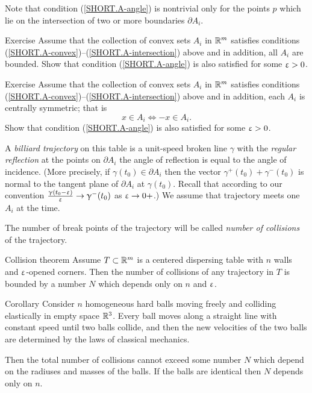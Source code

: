 Note that condition (\ref{SHORT.A-angle}) is nontrivial 
only for the points $p$ which lie 
on the intersection 
of two or more boundaries $\partial A_i$.

\begin{thm}{Exercise}
Assume that the collection of convex sets $A_i$ in $\mathbb{R}^m$ satisfies conditions (\ref{SHORT.A-convex})--(\ref{SHORT.A-intersection}) above and in addition, all $A_i$ are bounded.
Show that condition (\ref{SHORT.A-angle}) is also satisfied for some $\upvarepsilon>0$.
\end{thm}

\begin{thm}{Exercise}
Assume that the collection of convex sets $A_i$ in $\mathbb{R}^m$ satisfies conditions (\ref{SHORT.A-convex})--(\ref{SHORT.A-intersection}) above and in addition, each $A_i$ is centrally symmetric; that is 
\[x\in A_i\iff -x\in A_i.\]
Show that condition (\ref{SHORT.A-angle}) is also satisfied for some $\upvarepsilon>0$.
\end{thm}

A \emph{billiard trajectory} 
on this table is a unit-speed broken line $\gamma$
with the \emph{regular reflection} at the points on $\partial A_i$ the angle of reflection is equal to the angle
of incidence.
(More precisely,  if $\gamma(t_0)\in\partial A_i$ then the vector
$\gamma^+(t_0)+\gamma^-(t_0)$  is normal to the tangent
plane of $\partial A_i$ at $\gamma(t_0)$.
Recall that according to our convention  $\tfrac{\gamma(t_0-\eps)}{\eps}\to\gamma^-(t_0)$ as $\eps\to0+$.)
We assume that trajectory meets one $A_i$ at the time.

The number of break
points of the trajectory will be called \emph{number of collisions} of the trajectory.

\begin{thm}{Collision theorem}\label{thm:baby-collision}
Assume $T\subset\RR^m$
is a centered dispersing table 
with $n$ walls and $\upvarepsilon$-opened corners.
Then the number of collisions of any trajectory in  $T$  is bounded
by a number $N$ which depends only on $n$ and $\upvarepsilon$.
\end{thm}

\begin{thm}{Corollary}\label{cor:balls}
Consider $n$ homogeneous hard balls
moving freely and colliding
elastically in empty space $\mathbb{R}^3$. 
Every ball moves
along a straight line with constant speed until two balls collide, and then
the new velocities of the two balls are determined by the
laws of classical mechanics.

Then the total number of collisions cannot exceed some number $N$ which depend on the radiuses and masses of the balls.
If the balls are identical then $N$ depends only on $n$.
\end{thm}

